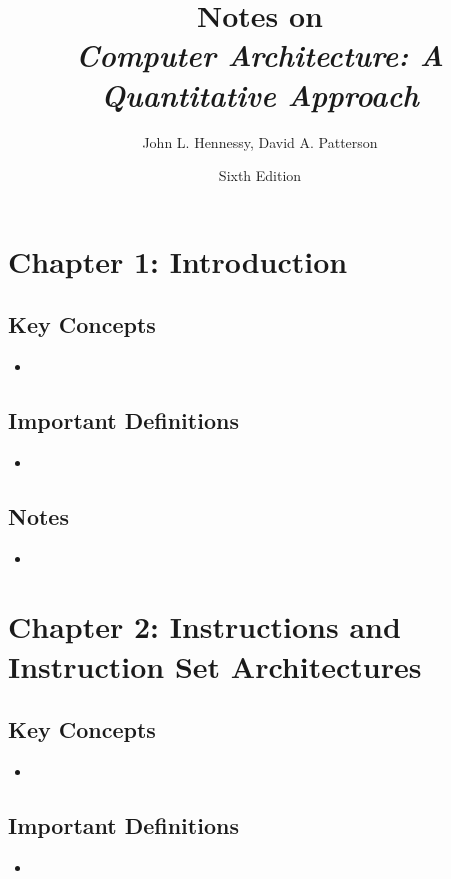 \documentclass[12pt]{article}
\title{Notes on \\ \textit{Computer Architecture: A Quantitative Approach}}
\author{John L. Hennessy, David A. Patterson}
\date{Sixth Edition}
\begin{document}
\maketitle
\tableofcontents
\newpage

\section*{Chapter 1: Introduction}
\subsection*{Key Concepts}
\begin{itemize}
    \item 
\end{itemize}

\subsection*{Important Definitions}
\begin{itemize}
    \item 
\end{itemize}

\subsection*{Notes}
\begin{itemize}
    \item 
\end{itemize}

\newpage

\section*{Chapter 2: Instructions and Instruction Set Architectures}
\subsection*{Key Concepts}
\begin{itemize}
    \item 
\end{itemize}

\subsection*{Important Definitions}
\begin{itemize}
    \item 
\end{itemize}
\end{document}

